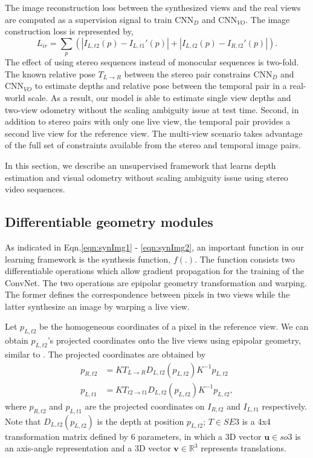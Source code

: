 \documentclass[10pt,twocolumn,letterpaper]{article}
\begin{document}
The image reconstruction loss between the synthesized views and the real views are computed as a supervision signal to train $\text{CNN}_{D}$ and $\text{CNN}_{VO}$. The image construction loss is represented by,
%
\begin{equation}
    L_{ir} = \sum_{p} \left( {|I_{L,t2}(p) - I_{L,t1}'(p)|}  + 
    {|I_{L,t2}(p) - I_{R,t2}'(p)|} \right). \label{eqn:imgLoss}
\end{equation}
%
The effect of using stereo sequences instead of monocular sequences is two-fold. 
The known relative pose $T_{L \rightarrow R}$ between the stereo pair constrains $\text{CNN}_D$ and $\text{CNN}_{VO}$ to estimate depths and relative pose between the temporal pair in a real-world scale. As a result, our model is able to estimate single view depths and two-view odometry without the scaling ambiguity issue at test time.
Second, in addition to stereo pairs with only one live view, the temporal pair provides a second live view for the reference view. The multi-view scenario takes advantage of the full set of constraints available from the stereo and temporal image pairs.

In this section, we describe an unsupervised framework that learns depth estimation and visual odometry without scaling ambiguity issue using stereo video sequences. 



\subsection{Differentiable geometry modules} \label{sec:method_diffGeoModules}

As indicated in Eqn.\ref{eqn:synImg1} - \ref{eqn:synImg2}, an important function in our learning framework is the synthesis function, $f(.)$. The function consists two differentiable operations which allow gradient propagation for the training of the ConvNet. 
The two operations are epipolar geometry transformation and warping. The former defines the correspondence between pixels in two views while the latter synthesize an image by warping a live view.


Let $p_{L,t2}$ be the homogeneous coordinates of a pixel in the reference view. 
We can obtain $p_{L,t2}$'s projected coordinates onto the live views using epipolar geometry, similar to \cite{handa2016gvnn,zhou2017sfmlearner}. The projected coordinates are obtained by
\begin{align}
    p_{R,t2} &= K T_{L \rightarrow R} D_{L,t2}(p_{L,t2}) K^{-1} p_{L,t2} \label{eqn:projCoorR}\\
    p_{L,t1} &= K T_{t2 \rightarrow t1} D_{L,t2}(p_{L,t2}) K^{-1} p_{L,t2} \label{eqn:projCoort1}, 
\end{align}
where $p_{R,t2}$ and $p_{L,t1}$ are the projected coordinates on $I_{R,t2}$ and $I_{L,t1}$ respectively.
Note that $D_{L,t2}(p_{L,t2})$ is the depth at position $p_{L,t2}$;
$T \in SE3$ is a 4x4 transformation matrix defined by 6 parameters, in which a 3D vector $\mathbf{u} \in so3$ is an axis-angle representation and a 3D vector $\mathbf{v} \in \mathbb{R}^{3}$ represents translations.
\end{document}
